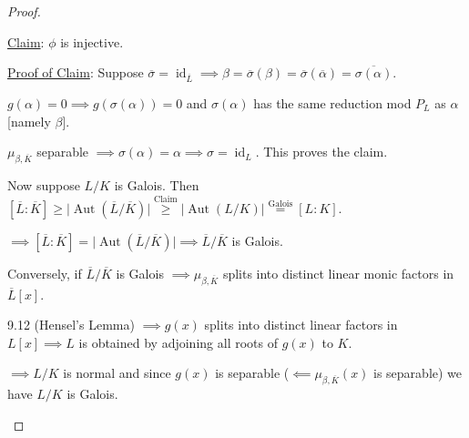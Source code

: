 \documentclass[openany]{amsbook}
\numberwithin{section}{chapter}
\theoremstyle{definition}
\begin{document}
\begin{proof}
\begin{enumerate}[label=\roman*)]
    \underline{Claim}: \(\phi\) is injective.

    \underline{Proof of Claim}: Suppose \(\overline{\sigma} = \operatorname{id}_{\overline{L}} \implies \beta = \overline{\sigma} (\beta) = \overline{\sigma} (\overline{\alpha}) = \overline{\sigma(\alpha)}\).
    
    \(g(\alpha)=0 \implies g(\sigma(\alpha))= 0\) and \(\sigma(\alpha)\) has the same reduction mod \(P_L\) as \(\alpha\) [namely \(\beta \)].

    \(\mu_{\beta, \overline{K}}\) separable \(\implies \sigma (\alpha) = \alpha  \implies \sigma = \operatorname{id}_L\). This proves the claim.

    Now suppose \(L / K\) is Galois. Then \([\overline{L}: \overline{K}] \geq \vert \operatorname{Aut} (\overline{L}/\overline{K}) \vert \overset{\text{Claim}}{\geq} \vert \operatorname{Aut} (L / K) \vert \overset{\text{Galois}}{=} [L:K]\).
    
    \(\implies [\overline{L}:\overline{K}] = \vert \operatorname{Aut} (\overline{L} / \overline{K}) \vert \implies \overline{L} / \overline{K}\) is Galois. 

    Conversely, if \(\overline{L} / \overline{K}\) is Galois \(\implies \mu_{\beta, \overline{K}}\) splits into distinct linear monic factors in \(\overline{L}[x]\).

    9.12 (Hensel's Lemma) \(\implies g(x)\) splits into distinct linear factors in \(L[x] \implies L\) is obtained by adjoining all roots of \(g(x)\) to \(K\).

    \(\implies L / K\) is normal and since \(g(x)\) is separable (\(\impliedby \mu_{\beta, \overline{K}}(x)\) is separable) we have \(L / K\) is Galois.
    \end{enumerate} 
\end{proof}
\end{document}
